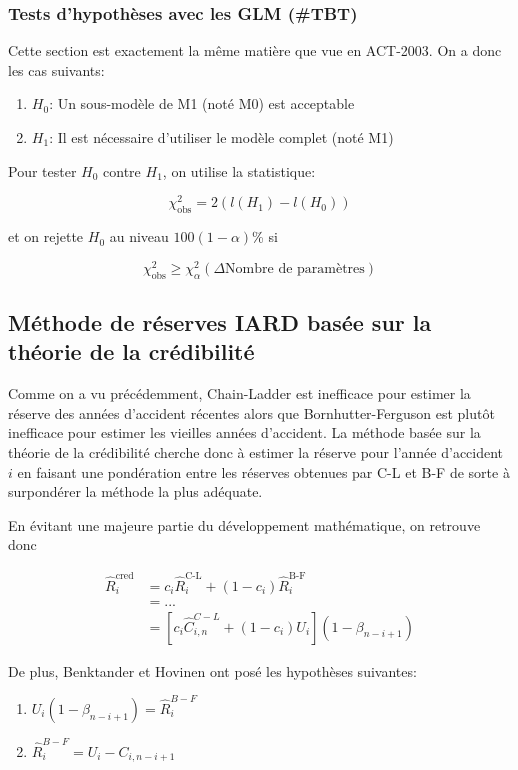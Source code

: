 \documentclass[11pt,french]{report}
\begin{document}
\subsubsection*{Tests d'hypothèses avec les GLM (\#TBT)}

Cette section est exactement la même matière que vue en ACT-2003. On a donc les cas suivants:

\begin{enumerate}
\item $H_0$: Un sous-modèle de M1 (noté M0) est acceptable
\item $H_1$: Il est nécessaire d'utiliser le modèle complet (noté M1)
\end{enumerate}

Pour tester $H_0$ contre $H_1$, on utilise la statistique:

$$\chi^2_{\text{obs}}=2\left(l(H_1) - l(H_0) \right)$$

et on rejette $H_0$ au niveau $100(1- \alpha)$\% si

$$\chi^2_{\text{obs}} \ge \chi_\alpha^2(\Delta \text{Nombre de paramètres})$$

\subsection*{Méthode de réserves IARD basée sur la théorie de la crédibilité}

Comme on a vu précédemment, Chain-Ladder est inefficace pour estimer la réserve des années d'accident récentes alors que Bornhutter-Ferguson est plutôt inefficace pour estimer les vieilles années d'accident. La méthode basée sur la théorie de la crédibilité cherche donc à estimer la réserve pour l'année d'accident $i$ en faisant une pondération entre les réserves obtenues par C-L et B-F de sorte à surpondérer la méthode la plus adéquate.

En évitant une majeure partie du développement mathématique, on retrouve donc

$$\boxed{\begin{aligned}
\widehat{R}_i^{\text{cred}} &= c_i \widehat{R}_i^{\text{C-L}} + (1-c_i) \widehat{R}_i^{\text{B-F}} \\
 &= ... \\
 &= \left[c_i \widehat{C}_{i,n}^{C-L} + (1-c_i) U_i \right](1 - \beta_{n-i+1})
\end{aligned}}$$

De plus, Benktander et Hovinen ont posé les hypothèses suivantes:
\begin{enumerate}
\item $U_i(1-\beta_{n-i+1}) = \widehat{R}_i^{B-F}$
\item $\widehat{R}_i^{B-F} = U_i - C_{i,n-i+1}$
\end{enumerate}
\end{document}
